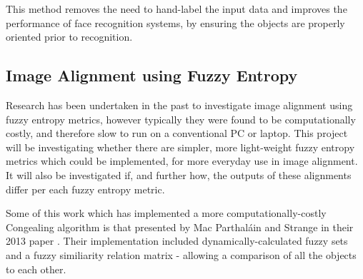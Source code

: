 This method removes the need to hand-label the input data and improves the performance of face recognition systems, by ensuring the objects are properly oriented prior to recognition.

\subsection{Image Alignment using Fuzzy Entropy}

Research has been undertaken in the past to investigate image alignment using fuzzy entropy metrics, however typically they were found to be computationally costly, and therefore slow to run on a conventional PC or laptop. This project will be investigating whether there are simpler, more light-weight fuzzy entropy metrics which could be implemented, for more everyday use in image alignment. It will also be investigated if, and further how, the outputs of these alignments differ per each fuzzy entropy metric.

Some of this work which has implemented a more computationally-costly \Gls{Congealing} algorithm is that presented by Mac Parthal\'ain and Strange in their 2013 paper  \cite{Mac_Parthalain_Strange_2013}.  Their implementation included dynamically-calculated fuzzy sets and a fuzzy similiarity relation matrix - allowing a comparison of all the objects to each other.
